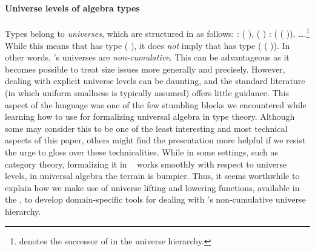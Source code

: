 \begin{code}
\AgdaSpace{}%
\AgdaSymbol{)}\AgdaSpace{}%
\AgdaSpace{}%
\AgdaSymbol{(}\AgdaSpace{}%
\AgdaSpace{}%
\AgdaSpace{}%
%
\>[48]%
\>[51]\AgdaOperator{\AgdaFunction{𝕌[}}\AgdaSpace{}%
\AgdaSpace{}%
\AgdaOperator{\AgdaFunction{]}}\AgdaSymbol{)}\AgdaSpace{}%
\AgdaSpace{}%
\AgdaOperator{\AgdaFunction{𝕌[}}\AgdaSpace{}%
\AgdaSpace{}%
\AgdaOperator{\AgdaFunction{]}}\<%
\\
\>[0]\AgdaSpace{}%
\AgdaSpace{}%
\AgdaSpace{}%
\AgdaSymbol{=}\AgdaSpace{}%
\AgdaSpace{}%
\AgdaSpace{}%
\AgdaSpace{}%
\AgdaSymbol{(}\AgdaSpace{}%
\AgdaSymbol{)}\AgdaSpace{}%
\AgdaSpace{}%
\AgdaSymbol{(}\AgdaSpace{}%
\AgdaOperator{\AgdaInductiveConstructor{,}}\AgdaSpace{}%
\AgdaSymbol{)}\<%
\end{code}
\fi

\paragraph*{Universe levels of algebra types}
Types belong to \emph{universes}, which are structured in \agda as
follows:
  :  ( ),  ( ) : 
( ( )), ….\footnote{  denotes the successor of  in the universe hierarchy.} While this means that   has type 
( ), it does \emph{not} imply that   has type
 ( ( )). In other words, \agda's universes are
\emph{non-cumulative}.
This can be advantageous as it becomes possible to treat size issues
more generally and precisely.  However, dealing with explicit
universe levels can be daunting, and the standard literature
(in which uniform smallness is typically assumed) offers little guidance.
\ifshort\else
This aspect of the language was one of the few stumbling
blocks we encountered while learning how to use \agda for formalizing universal algebra in
type theory. Although some may consider this to be one of the least interesting and most
technical aspects of this paper, others might find the presentation more helpful if we
resist the urge to gloss over these technicalities.
\fi
While in some settings, such as category theory, formalizing it in \agda~\cite{agda-categories}
works smoothly with respect to universe levels, in universal algebra the terrain is bumpier.
Thus, it seems worthwhile to explain how we make use
of universe lifting and lowering functions, available in the \agdastdlib, to
develop domain-specific tools for dealing with \agda's non-cumulative universe hierarchy.

